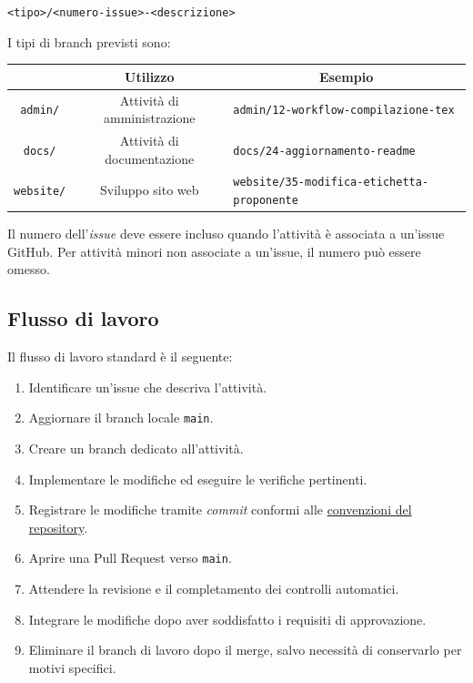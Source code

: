 \documentclass[11pt, a4paper]{article}
\begin{document}
\noindent \texttt{<tipo>/<numero-issue>-<descrizione>}

I tipi di branch previsti sono:

\begin{center}
    \renewcommand{\arraystretch}{1.5}
    \begin{tabularx}{\textwidth}{|c|c|X|}
        \hline
        \rowcolor{gray!10} 
        \multicolumn{1}{|c|}{\textbf{Tipo}} & 
        \multicolumn{1}{c|}{\textbf{Utilizzo}} & 
        \multicolumn{1}{c|}{\textbf{Esempio}} \\
        \hline
        \texttt{admin/} & Attività di amministrazione & \texttt{admin/12-workflow-compilazione-tex}\\
        \hline
        \texttt{docs/} & Attività di documentazione & \texttt{docs/24-aggiornamento-readme}\\
        \hline
        \texttt{website/} & Sviluppo sito web & \texttt{website/35-modifica-etichetta-proponente}\\
        \hline
    \end{tabularx}
\end{center}

Il numero dell'\textit{issue} deve essere incluso quando l'attività è associata a un'issue GitHub. Per attività minori non associate a un'issue, il numero può essere omesso.

\subsection{Flusso di lavoro}

Il flusso di lavoro standard è il seguente:
\begin{enumerate}
    \item Identificare un'issue che descriva l'attività.
    \item Aggiornare il branch locale \texttt{main}.
    \item Creare un branch dedicato all'attività.
    \item Implementare le modifiche ed eseguire le verifiche pertinenti.
    \item Registrare le modifiche tramite \textit{commit} conformi alle \hyperref[sec:linee-guida-per-i-commit]{convenzioni del repository}.
    \item Aprire una Pull Request verso \texttt{main}.
    \item Attendere la revisione e il completamento dei controlli automatici.
    \item Integrare le modifiche dopo aver soddisfatto i requisiti di approvazione.
    \item Eliminare il branch di lavoro dopo il merge, salvo necessità di conservarlo per motivi specifici.
\end{enumerate}
\end{document}

